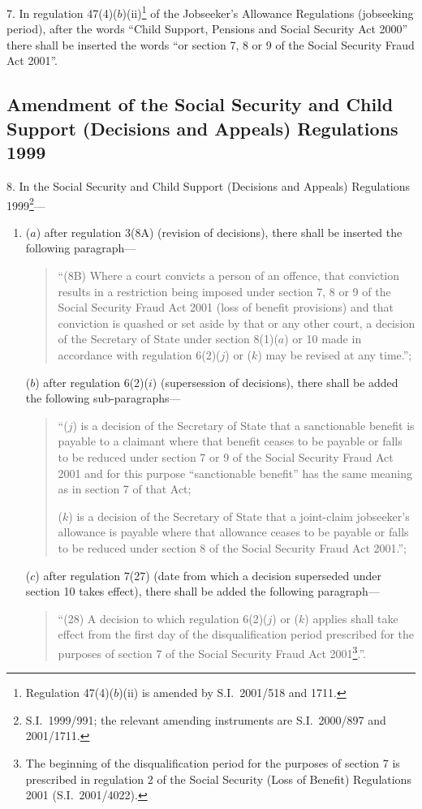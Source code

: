 \documentclass[12pt,a4paper]{article}
\begin{document}
7.  In regulation 47(4)($b$)(ii)\footnote{Regulation 47(4)($b$)(ii) is amended by S.I.\ 2001/518 and 1711.} of the Jobseeker’s Allowance Regulations (jobseeking period), after the words “Child Support, Pensions and Social Security Act 2000” there shall be inserted the words “or section 7, 8 or 9 of the Social Security Fraud Act 2001”.

\subsection[8. Amendment of the Social Security and Child Support (Decisions and Appeals) Regulations 1999]{Amendment of the Social Security and Child Support (Decisions and Appeals) Regulations 1999}

8.  In the Social Security and Child Support (Decisions and Appeals) Regulations 1999\footnote{S.I.\ 1999/991; the relevant amending instruments are S.I.\ 2000/897 and 2001/1711.}—
\begin{enumerate}\item[]
($a$) after regulation 3(8A) (revision of decisions), there shall be inserted the following paragraph—
\begin{quotation}
“(8B) Where a court convicts a person of an offence, that conviction results in a restriction being imposed under section 7, 8 or 9 of the Social Security Fraud Act 2001 (loss of benefit provisions) and that conviction is quashed or set aside by that or any other court, a decision of the Secretary of State under section 8(1)($a$)  or 10 made in accordance with regulation 6(2)($j$)  or ($k$)  may be revised at any time.”;
\end{quotation}

($b$) after regulation 6(2)($i$) (supersession of decisions), there shall be added the following sub-paragraphs—
\begin{quotation}
“($j$) is a decision of the Secretary of State that a sanctionable benefit is payable to a claimant where that benefit ceases to be payable or falls to be reduced under section 7 or 9 of the Social Security Fraud Act 2001 and for this purpose “sanctionable benefit” has the same meaning as in section 7 of that Act;

($k$) is a decision of the Secretary of State that a joint-claim jobseeker’s allowance is payable where that allowance ceases to be payable or falls to be reduced under section 8 of the Social Security Fraud Act 2001.”;
\end{quotation}

($c$) after regulation 7(27) (date from which a decision superseded under section 10 takes effect), there shall be added the following paragraph—
\begin{quotation}
“(28) A decision to which regulation 6(2)($j$)  or ($k$)  applies shall take effect from the first day of the disqualification period prescribed for the purposes of section 7 of the Social Security Fraud Act 2001\footnote{The beginning of the disqualification period for the purposes of section 7 is prescribed in regulation 2 of the Social Security (Loss of Benefit) Regulations 2001 (S.I.\ 2001/4022).}.”.
\end{quotation}
\end{enumerate}
\end{document}
